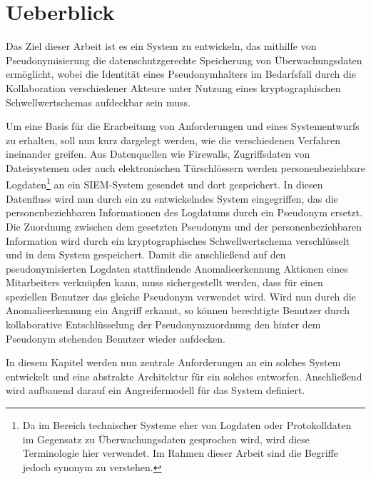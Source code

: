 \chapter{Ueberblick}
\label{cha_overview}

Das Ziel dieser Arbeit ist es ein System zu entwickeln, das mithilfe von Pseudonymisierung die datenschutzgerechte Speicherung von Überwachungsdaten ermöglicht, wobei die Identität eines Pseudonymhalters im Bedarfsfall durch die Kollaboration verschiedener Akteure unter Nutzung eines kryptographischen Schwellwertschemas aufdeckbar sein muss.

Um eine Basis für die Erarbeitung von Anforderungen und eines Systementwurfs zu erhalten, soll nun kurz dargelegt werden, wie die verschiedenen Verfahren ineinander greifen. Aus Datenquellen wie Firewalls, Zugriffsdaten von Dateisystemen oder auch elektronischen Türschlössern werden personenbeziehbare Logdaten\footnote{
  Da im Bereich technischer Systeme eher von Logdaten oder Protokolldaten im Gegensatz zu Überwachungsdaten gesprochen wird, wird diese Terminologie hier verwendet. Im Rahmen dieser Arbeit sind die Begriffe jedoch synonym zu verstehen.
} an ein SIEM-System gesendet und dort gespeichert. In diesen Datenfluss wird nun durch ein zu entwickelndes System eingegriffen, das die personenbeziehbaren Informationen des Logdatums durch ein Pseudonym ersetzt. Die Zuordnung zwischen dem gesetzten Pseudonym und der personenbeziehbaren Information wird durch ein kryptographisches Schwellwertschema verschlüsselt und in dem System gespeichert. Damit die anschließend auf den pseudonymisierten Logdaten stattfindende Anomalieerkennung Aktionen eines Mitarbeiters verknüpfen kann, muss sichergestellt werden, dass für einen speziellen Benutzer das gleiche Pseudonym verwendet wird. Wird nun durch die Anomalieerkennung ein Angriff erkannt, so können berechtigte Benutzer durch kollaborative Entschlüsselung der Pseudonymzuordnung den hinter dem Pseudonym stehenden Benutzer wieder aufdecken.

In diesem Kapitel werden nun zentrale Anforderungen an ein solches System entwickelt und eine abstrakte Architektur für ein solches entworfen. Anschließend wird aufbauend darauf ein Angreifermodell für das System definiert.





